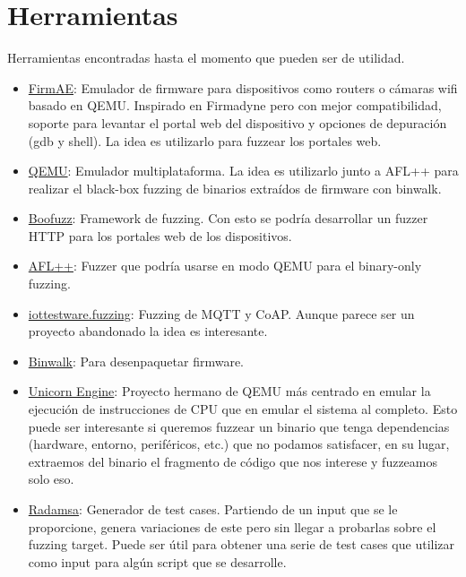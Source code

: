 \documentclass[11pt, a4paper, openany]{report}
\begin{document}
    \section{Herramientas}
    
    Herramientas encontradas hasta el momento que pueden ser de utilidad.
    \begin{itemize}
        \item \href{https://github.com/pr0v3rbs/FirmAE}{FirmAE}: Emulador de firmware para dispositivos
        como routers o cámaras wifi basado en QEMU. Inspirado en Firmadyne pero con mejor compatibilidad, soporte
        para levantar el portal web del dispositivo y opciones de depuración (gdb y shell). La idea es
        utilizarlo para fuzzear los portales web.
        \item \href{https://www.qemu.org/}{QEMU}: Emulador multiplataforma. La idea es utilizarlo junto a AFL++ para 
        realizar el black-box fuzzing de binarios extraídos de firmware con binwalk.
        \item \href{https://github.com/jtpereyda/boofuzz}{Boofuzz}: Framework de fuzzing. Con esto se podría
        desarrollar un fuzzer HTTP para los portales web de los dispositivos.
        \item \href{https://github.com/AFLplusplus/AFLplusplus}{AFL++}: Fuzzer que podría usarse en 
        modo QEMU para el binary-only fuzzing.
        \item \href{https://github.com/eclipse/iottestware.fuzzing}{iottestware.fuzzing}: Fuzzing de MQTT y CoAP.
        Aunque parece ser un proyecto abandonado la idea es interesante.
        \item \href{https://github.com/ReFirmLabs/binwalk}{Binwalk}: Para desenpaquetar firmware.
        \item \href{https://github.com/unicorn-engine/unicorn}{Unicorn Engine}: Proyecto hermano de QEMU más centrado en
        emular la ejecución de instrucciones de CPU que en emular el sistema al completo. Esto puede ser interesante si
        queremos fuzzear un binario que tenga dependencias (hardware, entorno, periféricos, etc.) que no podamos
        satisfacer, en su lugar, extraemos del binario el fragmento de código que nos interese y fuzzeamos solo eso.
        \item \href{https://gitlab.com/akihe/radamsa}{Radamsa}: Generador de test cases. Partiendo de un input que
        se le proporcione, genera variaciones de este pero sin llegar a probarlas sobre el fuzzing target. Puede ser
        útil para obtener una serie de test cases que utilizar como input para algún script que se desarrolle. 
    \end{itemize}
\end{document}
